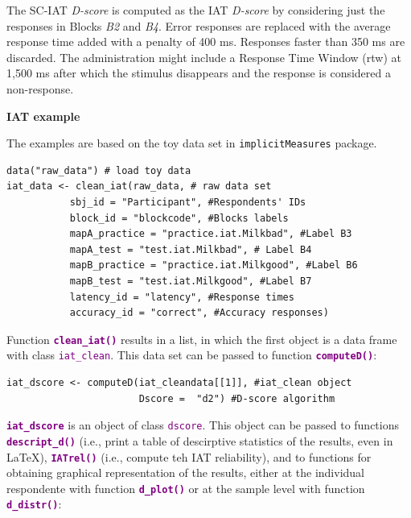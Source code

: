 \documentclass[a0,landscape]{a0poster}
\begin{document}
\begin{multicols*}{3}
\vspace{3mm}
The SC-IAT \emph{D-score} is computed as the IAT \emph{D-score} by considering just the responses in Blocks \emph{B2} and \emph{B4}. Error responses are replaced with the average response time added with a penalty of 400 ms. Responses faster than 350 ms are discarded. The administration might include a Response Time Window (rtw) at 1,500 ms after which the stimulus disappears and the response is considered a non-response. 



\vfill\null
\columnbreak

\begin{center}
	\huge \textbf{\textcolor{title}{IAT example}}
\end{center}

The examples are based on the toy data set in \texttt{implicitMeasures} package. 
\vspace{.4cm}
\begin{lstlisting}
data("raw_data") # load toy data
iat_data <- clean_iat(raw_data, # raw data set 
           sbj_id = "Participant", #Respondents' IDs
           block_id = "blockcode", #Blocks labels
           mapA_practice = "practice.iat.Milkbad", #Label B3
           mapA_test = "test.iat.Milkbad", # Label B4
           mapB_practice = "practice.iat.Milkgood", #Label B6
           mapB_test = "test.iat.Milkgood", #Label B7
           latency_id = "latency", #Response times
           accuracy_id = "correct", #Accuracy responses)
\end{lstlisting}

Function \textbf{\textcolor{purple}{\texttt{clean\_iat()}}} results in a list, in which the first object is a data frame with class \textcolor{purple}{\texttt{iat\_clean}}. This data set can be passed to function \textbf{\textcolor{purple}{\texttt{computeD()}}}: 
\begin{lstlisting}
iat_dscore <- computeD(iat_cleandata[[1]], #iat_clean object
                       Dscore =  "d2") #D-score algorithm
\end{lstlisting}

 \textbf{\textcolor{purple}{\texttt{iat\_dscore}}} is an object of class \textcolor{purple}{\texttt{dscore}}. This object can be passed to functions \textbf{\textcolor{purple}{\texttt{descript\_d()}}} (i.e., print a table of descirptive statistics of the results, even in \LaTeX), \textbf{\textcolor{purple}{\texttt{IATrel()}}} (i.e., compute teh IAT reliability), and to functions for obtaining graphical representation of the results, either at the individual respondente with function \textbf{\textcolor{purple}{\texttt{d\_plot()}}} or at the sample level with function \textbf{\textcolor{purple}{\texttt{d\_distr()}}}: 


\end{multicols*}
\end{document}
